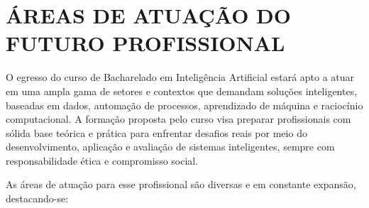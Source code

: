 \chapter{ÁREAS DE ATUAÇÃO DO FUTURO PROFISSIONAL}
\label{cap:areas-de-atuacao}


O egresso do curso de Bacharelado em Inteligência Artificial estará apto a atuar em uma ampla gama de setores e contextos que demandam soluções inteligentes, baseadas em dados, automação de processos, aprendizado de máquina e raciocínio computacional. A formação proposta pelo curso visa preparar profissionais com sólida base teórica e prática para enfrentar desafios reais por meio do desenvolvimento, aplicação e avaliação de sistemas inteligentes, sempre com responsabilidade ética e compromisso social.

As áreas de atuação para esse profissional são diversas e em constante expansão, destacando-se:


